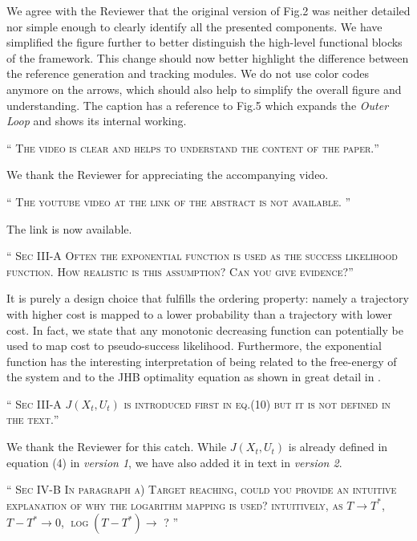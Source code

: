 \documentclass[10pt]{article}
\newcommand{\referee}[1]{\;
  \begin{minipage}[t]{.95\textwidth}
    ``{\small\color{red} \textsc{#1}}''
  \end{minipage}\medskip
  }
\newcommand{\version}[1]{\textit{version #1}}
\begin{document}
\begin{enumerate}[label={[R7:\,\arabic{enumi}]}]
We agree with the Reviewer that the original version of Fig.2 was neither detailed nor simple enough to clearly identify all the presented components. We have simplified the figure further to better distinguish the high-level functional blocks of the framework. This change should now better highlight the difference between the reference generation and tracking modules. We do not use color codes anymore on the arrows, which should also help to simplify the overall figure and understanding. The caption has a reference to Fig.5 which expands the \emph{Outer Loop} and shows its internal working.

\item\label{reply:R7:31} 
\referee{The video  is clear and helps to understand the content of the paper.}

We thank the Reviewer for appreciating the accompanying video.

\item\label{reply:R7:32} 
\referee{The youtube video at the link of the abstract is not available. 
}

The link is now available.

\item\label{reply:R7:33} 
\referee{Sec III-A Often the exponential function is used as the success likelihood function. How realistic is this assumption? Can you give evidence?}

It is purely a design choice that fulfills the ordering property: namely a trajectory with higher cost is mapped to a lower probability than a trajectory with lower cost. In fact, we state that any monotonic decreasing function can potentially be used to map cost to pseudo-success likelihood. Furthermore, the exponential function has the interesting interpretation of being related to the free-energy of the system and to the JHB optimality equation as shown in great detail in \cite{theodorou_nonlinear_2015}.  

\item\label{reply:R7:34} 
\referee{Sec III-A $J(X_t,U_t)$ is introduced first in eq.(10) but it is not defined in the text.}

We thank the Reviewer for this catch. While $J(X_t, U_t)$ is already defined in equation (4) in \version{1}, we have also added it in text in \version{2}.

\item\label{reply:R7:35} 
\referee{Sec IV-B In paragraph a) Target reaching, could you provide an intuitive explanation of why the logarithm mapping is used? intuitively, as $T \rightarrow T^*$, $T-T^* \rightarrow 0$, $\log(T-T^*) \rightarrow $ ?
}


\end{enumerate}
\end{document}
